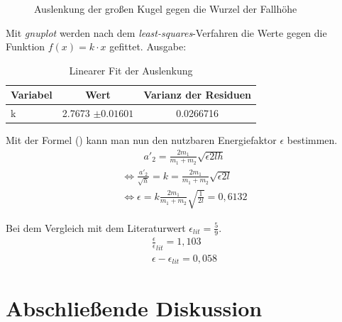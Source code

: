 \begin{figure}[H]
  \centering
  \caption{Auslenkung der großen Kugel gegen die Wurzel der Fallhöhe}
  \label{fig:auslenkung}
\end{figure}

Mit \emph{gnuplot} werden nach dem \emph{least-squares}-Verfahren die Werte gegen die Funktion $f(x)=k\cdot x$ gefittet. Ausgabe:

\begin{table}[H]
  \centering
  \begin{tabular}{l | c | c}
    Variabel & Wert & Varianz der Residuen \\ \hline
    k & \num{2.7673} $\pm0.01601$  & \num{0.0266716} 
  \end{tabular}
  \caption{Linearer Fit der Auslenkung}
  \label{tab:durchbiegungsfit}
\end{table}

Mit der Formel () kann man nun den nutzbaren Energiefaktor $\epsilon$ bestimmen.
\begin{gather}
a'_2=\frac{2m_1}{m_1+m_2}\sqrt{\epsilon 2lh}
\end{gather}\begin{gather*}
\iff \frac{a'_2}{\sqrt{h}}=k=\frac{2m_1}{m_1+m_2}\sqrt{\epsilon 2l}\\
\iff \epsilon = k \frac{2m_1}{m_1+m_2}\sqrt{\frac{1}{2l}}= 0,6132
\end{gather*}

Bei dem Vergleich mit dem Literaturwert $\epsilon_{lit}=\frac{5}{9}$.
\begin{gather}
\frac{\epsilon}\epsilon_{lit}=1,103\\
\epsilon - \epsilon_{lit}= 0,058
\end{gather}
\section{Abschließende Diskussion}



\nocite{anleitung-ws2014}
